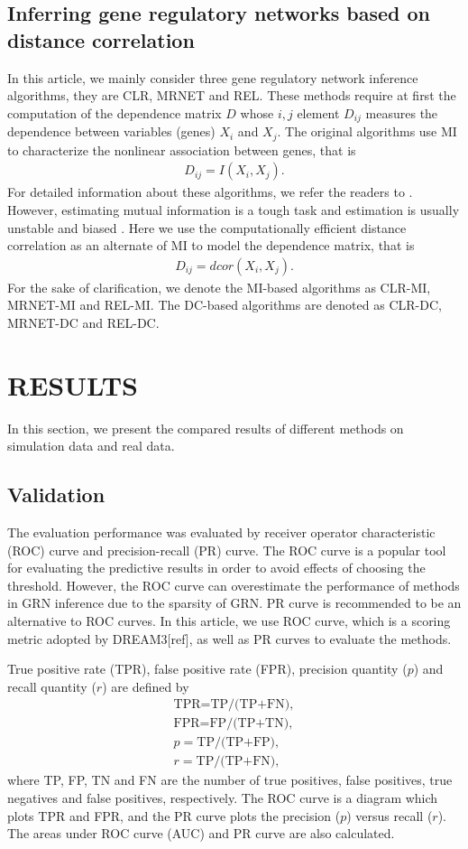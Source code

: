\documentclass{bioinfo}
\begin{document}
\subsection{Inferring gene regulatory networks based on distance correlation}
In this article, we mainly consider three gene regulatory network
inference algorithms, they are CLR, MRNET and REL. These methods
require at first the computation of the dependence matrix $D$ whose
$i,j$ element $D_{ij}$ measures the dependence between variables
(genes) $X_i$ and $X_j$. The original algorithms use MI to
characterize the nonlinear association between genes, that is
\begin{align*}
D_{ij}=I(X_i,X_j).
\end{align*}
For detailed information about these algorithms, we refer the
readers to \citep{faith2007large,meyer2008minet,butte2000mutual}. However, estimating mutual information
is a tough task and estimation is usually unstable and biased \citep{meyer2008minet, de2012bagging}. Here we use the computationally efficient distance correlation as an alternate of MI to
model the dependence matrix, that is
\begin{align*}
D_{ij}=dcor(X_i,X_j).
\end{align*}
For the sake of clarification, we denote the MI-based algorithms as
CLR-MI, MRNET-MI and REL-MI. The DC-based algorithms are denoted as
CLR-DC, MRNET-DC and REL-DC.


\section{RESULTS}
In this section, we present the compared results of different
methods on simulation data and real data.
\subsection{Validation}
The evaluation performance was evaluated by receiver operator
characteristic (ROC) curve and precision-recall (PR) curve. The ROC
curve is a popular tool for evaluating the predictive results in
order to avoid effects of choosing the threshold.  However, the ROC
curve can overestimate the performance of methods in GRN inference
due to the sparsity of GRN\citep{davis2006relationship}. PR curve is
recommended to be an alternative to ROC
curves\citep{meyer2007information}.  In this article, we use ROC
curve, which is a scoring metric adopted by DREAM3[ref], as well as
PR curves to evaluate the methods.

True positive rate (TPR), false positive rate (FPR), precision
quantity ($p$) and recall quantity ($r$) are defined by
\begin{align*}
    \mbox{TPR=TP/(TP+FN}),\\
    \mbox{FPR=FP/(TP+TN)},\\
    p=\mbox{TP/(TP+FP)},\\
    r=\mbox{TP/(TP+FN)},
\end{align*}
where TP, FP, TN and FN are the number of true positives, false
positives, true negatives and false positives, respectively. The ROC
curve is a diagram which plots TPR and FPR, and the PR curve plots
the precision ($p$)  versus recall ($r$). The areas under ROC curve
(AUC) and PR curve are also calculated.
\end{document}
